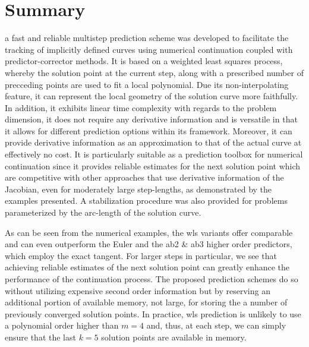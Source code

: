 \clearpage
\section{Summary}

a fast and reliable multistep prediction scheme was developed to
facilitate the tracking of implicitly defined curves using numerical
continuation coupled with predictor-corrector methods. It is based
on a weighted least squares process, whereby the solution point at the current
step, along with a prescribed number of precceding points are used to fit a
local polynomial. Due its non-interpolating feature, it can represent the local
geometry of the solution curve more faithfully. In addition, it exhibits linear
time complexity with regards to the problem dimension, it does not
require any derivative information and is versatile in
that it allows for different prediction options within its framework. Moreover,
it can provide derivative information as an approximation to that of the actual 
curve at effectively no cost. It is particularly suitable as a prediction
toolbox for numerical continuation since it provides reliable estimates for the 
next
solution point which are competitive with other approaches that use derivative 
information of the Jacobian, even for moderately large step-lengths, as
demonstrated by the examples presented. A
stabilization procedure was also provided for problems parameterized by the 
arc-length of the solution curve.  

As can be seen from the numerical examples, the \acrshort{wls} 
variants offer comparable and can even outperform the Euler and the 
\acrshort{ab2} \& \acrshort{ab3} 
higher order predictors, which employ the exact tangent. For larger steps in 
particular, we see that achieving reliable estimates of the next solution point 
can greatly enhance the performance of the continuation process. The proposed 
prediction schemes do so without utilizing expensive second order information 
but by reserving an additional portion of available memory, not large, for 
storing the a number of previously converged solution points. In practice, 
\acrshort{wls} prediction is unlikely to use a polynomial order higher than 
$m=4$ and, thus, at each step, we can simply ensure that the last $k=5$ 
solution points are available in memory. 




